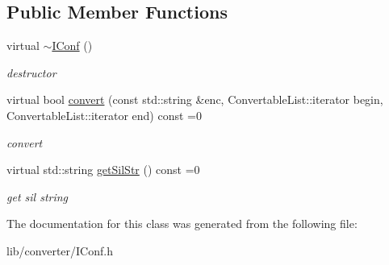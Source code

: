 \subsection*{\-Public \-Member \-Functions}
\begin{DoxyCompactItemize}
\item 
\hypertarget{classsinsy_1_1IConf_a1475838222465dda71482db6b745602c}{virtual \hyperlink{classsinsy_1_1IConf_a1475838222465dda71482db6b745602c}{$\sim$\-I\-Conf} ()}\label{classsinsy_1_1IConf_a1475838222465dda71482db6b745602c}

\begin{DoxyCompactList}\small\item\em destructor \end{DoxyCompactList}\item 
\hypertarget{classsinsy_1_1IConf_a892ad5cc8098a0b2bb720deade6dc0ee}{virtual bool \hyperlink{classsinsy_1_1IConf_a892ad5cc8098a0b2bb720deade6dc0ee}{convert} (const std\-::string \&enc, \-Convertable\-List\-::iterator begin, \-Convertable\-List\-::iterator end) const =0}\label{classsinsy_1_1IConf_a892ad5cc8098a0b2bb720deade6dc0ee}

\begin{DoxyCompactList}\small\item\em convert \end{DoxyCompactList}\item 
\hypertarget{classsinsy_1_1IConf_a6b4b753e87291960ccc88867d97ef280}{virtual std\-::string \hyperlink{classsinsy_1_1IConf_a6b4b753e87291960ccc88867d97ef280}{get\-Sil\-Str} () const =0}\label{classsinsy_1_1IConf_a6b4b753e87291960ccc88867d97ef280}

\begin{DoxyCompactList}\small\item\em get sil string \end{DoxyCompactList}\end{DoxyCompactItemize}


\-The documentation for this class was generated from the following file\-:\begin{DoxyCompactItemize}
\item 
lib/converter/\-I\-Conf.\-h\end{DoxyCompactItemize}
